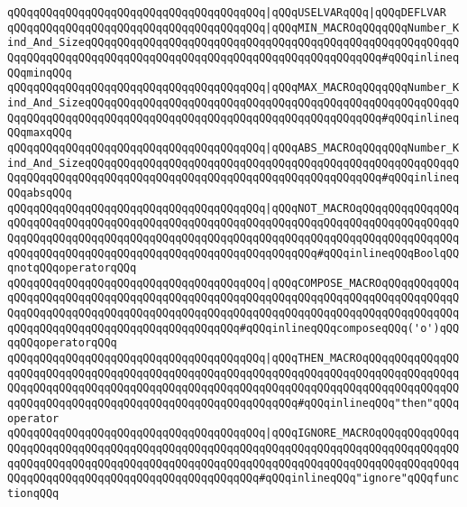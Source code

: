 \verb|qQQqqQQqqQQqqQQqqQQqqQQqqQQqqQQqqQQqqQQq|\verb#|qQQqUSELVARqQQq|qQQqDEFLVAR#\newline
\newline
\verb|qQQqqQQqqQQqqQQqqQQqqQQqqQQqqQQqqQQqqQQq|\verb#|qQQqMIN_MACROqQQqqQQqNumber_Kind_And_SizeqQQqqQQqqQQqqQQqqQQqqQQqqQQqqQQqqQQqqQQqqQQqqQQqqQQqqQQqqQQqqQQqqQQqqQQqqQQqqQQqqQQqqQQqqQQqqQQqqQQqqQQqqQQqqQQqqQQq#\verb|#qQQqinlineqQQqminqQQq|\newline
\verb|qQQqqQQqqQQqqQQqqQQqqQQqqQQqqQQqqQQqqQQq|\verb#|qQQqMAX_MACROqQQqqQQqNumber_Kind_And_SizeqQQqqQQqqQQqqQQqqQQqqQQqqQQqqQQqqQQqqQQqqQQqqQQqqQQqqQQqqQQqqQQqqQQqqQQqqQQqqQQqqQQqqQQqqQQqqQQqqQQqqQQqqQQqqQQqqQQq#\verb|#qQQqinlineqQQqmaxqQQq|\newline
\newline
\verb|qQQqqQQqqQQqqQQqqQQqqQQqqQQqqQQqqQQqqQQq|\verb#|qQQqABS_MACROqQQqqQQqNumber_Kind_And_SizeqQQqqQQqqQQqqQQqqQQqqQQqqQQqqQQqqQQqqQQqqQQqqQQqqQQqqQQqqQQqqQQqqQQqqQQqqQQqqQQqqQQqqQQqqQQqqQQqqQQqqQQqqQQqqQQqqQQq#\verb|#qQQqinlineqQQqabsqQQq|\newline
\verb|qQQqqQQqqQQqqQQqqQQqqQQqqQQqqQQqqQQqqQQq|\verb#|qQQqNOT_MACROqQQqqQQqqQQqqQQqqQQqqQQqqQQqqQQqqQQqqQQqqQQqqQQqqQQqqQQqqQQqqQQqqQQqqQQqqQQqqQQqqQQqqQQqqQQqqQQqqQQqqQQqqQQqqQQqqQQqqQQqqQQqqQQqqQQqqQQqqQQqqQQqqQQqqQQqqQQqqQQqqQQqqQQqqQQqqQQqqQQqqQQqqQQqqQQqqQQqqQQqqQQq#\verb|#qQQqinlineqQQqBoolqQQqnotqQQqoperatorqQQq|\newline
\verb|qQQqqQQqqQQqqQQqqQQqqQQqqQQqqQQqqQQqqQQq|\verb#|qQQqCOMPOSE_MACROqQQqqQQqqQQqqQQqqQQqqQQqqQQqqQQqqQQqqQQqqQQqqQQqqQQqqQQqqQQqqQQqqQQqqQQqqQQqqQQqqQQqqQQqqQQqqQQqqQQqqQQqqQQqqQQqqQQqqQQqqQQqqQQqqQQqqQQqqQQqqQQqqQQqqQQqqQQqqQQqqQQqqQQqqQQqqQQqqQQqqQQqqQQq#\verb|#qQQqinlineqQQqcomposeqQQq('o')qQQqqQQqoperatorqQQq|\newline
\newline
\verb|qQQqqQQqqQQqqQQqqQQqqQQqqQQqqQQqqQQqqQQq|\verb#|qQQqTHEN_MACROqQQqqQQqqQQqqQQqqQQqqQQqqQQqqQQqqQQqqQQqqQQqqQQqqQQqqQQqqQQqqQQqqQQqqQQqqQQqqQQqqQQqqQQqqQQqqQQqqQQqqQQqqQQqqQQqqQQqqQQqqQQqqQQqqQQqqQQqqQQqqQQqqQQqqQQqqQQqqQQqqQQqqQQqqQQqqQQqqQQqqQQqqQQqqQQqqQQqqQQq#\verb|#qQQqinlineqQQq"then"qQQqoperator|\newline
\verb|qQQqqQQqqQQqqQQqqQQqqQQqqQQqqQQqqQQqqQQq|\verb#|qQQqIGNORE_MACROqQQqqQQqqQQqqQQqqQQqqQQqqQQqqQQqqQQqqQQqqQQqqQQqqQQqqQQqqQQqqQQqqQQqqQQqqQQqqQQqqQQqqQQqqQQqqQQqqQQqqQQqqQQqqQQqqQQqqQQqqQQqqQQqqQQqqQQqqQQqqQQqqQQqqQQqqQQqqQQqqQQqqQQqqQQqqQQqqQQqqQQqqQQqqQQq#\verb|#qQQqinlineqQQq"ignore"qQQqfunctionqQQq|\newline
